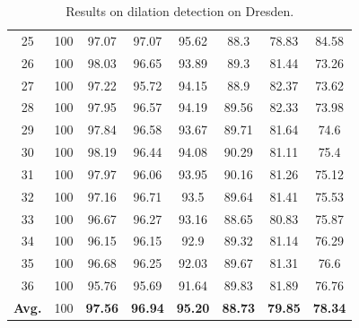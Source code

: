 \documentclass{ieeeaccess}
\begin{document}
\begin{table}[ht!]
\begin{minipage}{0.45\linewidth}
{\begin{tabular}{c|ccccccc}
				25&100&97.07&97.07&95.62&88.3&78.83&84.58\\
				26&100&98.03&96.65&93.89&89.3&81.44&73.26\\
				27&100&97.22&95.72&94.15&88.9&82.37&73.62\\
				28&100&97.95&96.57&94.19&89.56&82.33&73.98\\
				29&100&97.84&96.58&93.67&89.71&81.64&74.6\\
				30&100&98.19&96.44&94.08&90.29&81.11&75.4\\
				31&100&97.97&96.06&93.95&90.16&81.26&75.12\\
				32&100&97.16&96.71&93.5&89.64&81.41&75.53\\
				33&100&96.67&96.27&93.16&88.65&80.83&75.87\\
				34&100&96.15&96.15&92.9&89.32&81.14&76.29\\
				35&100&96.68&96.25&92.03&89.67&81.31&76.6\\
				36&100&95.76&95.69&91.64&89.83&81.89&76.76\\
				\hline
				\textbf{Avg.}&100&\textbf{97.56}&\textbf{96.94}&\textbf{95.20}&\textbf{88.73}&\textbf{79.85}&\textbf{78.34}\\
				\hline\hline	
		\end{tabular}}
	\end{minipage}
	\hspace{0.5cm}
	\begin{minipage}{0.45\linewidth}
		\centering
		\caption{Results on dilation detection on Dresden.}
		\label{table:dresdendilation}
\end{minipage}
\end{table}
\end{document}
